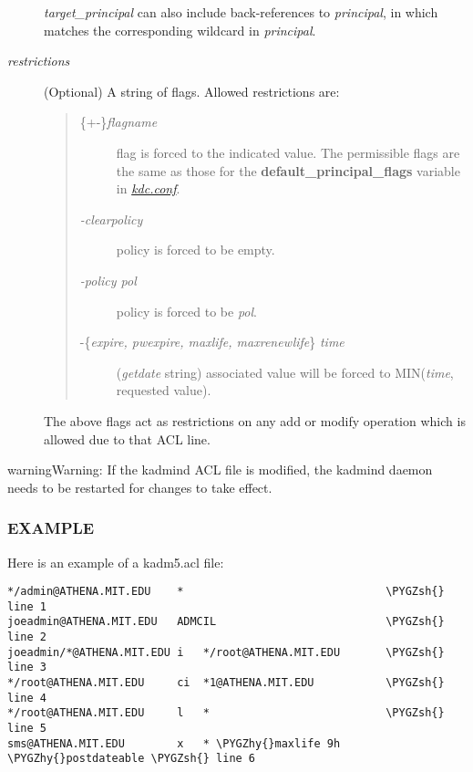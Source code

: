 \documentclass[letterpaper,10pt,english]{sphinxmanual}
\def\PYGZsh{\char`\#}
\def\PYGZhy{\char`\-}
\begin{document}
\begin{description}
\emph{target\_principal} can also include back-references to \emph{principal},
in which  matches the corresponding wildcard in
\emph{principal}.

\item[{\emph{restrictions}}] \leavevmode
(Optional) A string of flags. Allowed restrictions are:
\begin{quote}
\begin{description}
\item[{\{+\textbar{}-\}\emph{flagname}}] \leavevmode
flag is forced to the indicated value.  The permissible flags
are the same as those for the \textbf{default\_principal\_flags}
variable in {\hyperref[admin/conf_files/kdc_conf:kdc-conf-5]{\emph{kdc.conf}}}.

\item[{\emph{-clearpolicy}}] \leavevmode
policy is forced to be empty.

\item[{\emph{-policy pol}}] \leavevmode
policy is forced to be \emph{pol}.

\item[{-\{\emph{expire, pwexpire, maxlife, maxrenewlife}\} \emph{time}}] \leavevmode
(\emph{getdate} string) associated value will be forced to
MIN(\emph{time}, requested value).

\end{description}
\end{quote}

The above flags act as restrictions on any add or modify operation
which is allowed due to that ACL line.

\end{description}

\begin{notice}{warning}{Warning:}
If the kadmind ACL file is modified, the kadmind daemon needs to be
restarted for changes to take effect.
\end{notice}


\subsubsection{EXAMPLE}
\label{admin/conf_files/kadm5_acl:example}
Here is an example of a kadm5.acl file:

\begin{Verbatim}[commandchars=\\\{\}]
*/admin@ATHENA.MIT.EDU    *                               \PYGZsh{} line 1
joeadmin@ATHENA.MIT.EDU   ADMCIL                          \PYGZsh{} line 2
joeadmin/*@ATHENA.MIT.EDU i   */root@ATHENA.MIT.EDU       \PYGZsh{} line 3
*/root@ATHENA.MIT.EDU     ci  *1@ATHENA.MIT.EDU           \PYGZsh{} line 4
*/root@ATHENA.MIT.EDU     l   *                           \PYGZsh{} line 5
sms@ATHENA.MIT.EDU        x   * \PYGZhy{}maxlife 9h \PYGZhy{}postdateable \PYGZsh{} line 6
\end{Verbatim}
\end{document}
